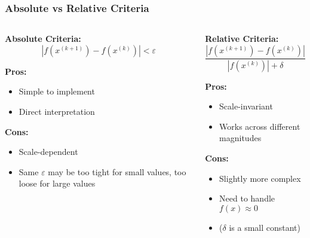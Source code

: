 \documentclass{beamer}
\begin{document}
\begin{frame}
\frametitle{Absolute vs Relative Criteria}
\begin{columns}
\begin{column}{0.5\textwidth}
\textbf{Absolute Criteria:}
$$|f(x^{(k+1)}) - f(x^{(k)})| < \varepsilon$$

\vspace{0.3cm}
\textbf{Pros:}
\begin{itemize}
    \item Simple to implement
    \item Direct interpretation
\end{itemize}

\textbf{Cons:}
\begin{itemize}
    \item Scale-dependent
    \item Same $\varepsilon$ may be too tight for small values, too loose for large values
\end{itemize}
\end{column}

\begin{column}{0.5\textwidth}
\textbf{Relative Criteria:}
$$\frac{|f(x^{(k+1)}) - f(x^{(k)})|}{|f(x^{(k)})| + \delta} < \varepsilon$$

\vspace{0.3cm}
\textbf{Pros:}
\begin{itemize}
    \item Scale-invariant
    \item Works across different magnitudes
\end{itemize}

\textbf{Cons:}
\begin{itemize}
    \item Slightly more complex
    \item Need to handle $f(x) \approx 0$
    \item ($\delta$ is a small constant)
\end{itemize}
\end{column}
\end{columns}
\end{frame}
\end{document}
